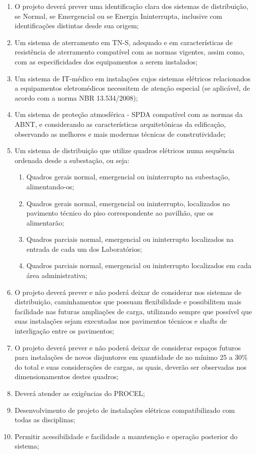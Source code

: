 \begin{enumerate}
	\item O projeto deverá prever uma identificação clara dos sistemas de distribuição, se Normal, se Emergencial ou se Energia Ininterrupta, inclusive com identificações distintas desde sua origem;
	
	\item Um sistema de aterramento em TN-S, adequado e em características de resistência de aterramento compatível com as normas vigentes, assim como, com as especificidades dos equipamentos a serem instalados;
	
	\item Um sistema de IT-médico em instalações cujos sistemas elétricos relacionados a equipamentos eletromédicos necessitem de atenção especial (se aplicável, de acordo com a norma NBR 13.534/2008); 
	
	\item Um sistema de proteção atmosférica - SPDA compatível com as normas da ABNT, e considerando as características arquitetônicas da edificação, observando as melhores e mais modernas técnicas de construtividade;
	
	\item Um sistema de distribuição que utilize quadros elétricos numa sequência ordenada desde a subestação, ou seja:
		\begin{enumerate}
			\item Quadros gerais normal, emergencial ou ininterrupto na subestação, alimentando-os;
			\item Quadros gerais normal, emergencial ou ininterrupto, localizados no pavimento técnico do piso correspondente ao pavilhão, que os alimentarão;
			\item Quadros parciais normal, emergencial ou ininterrupto localizados na entrada de cada um dos Laboratórios;
			\item Quadros parciais normal, emergencial ou ininterrupto localizados em cada área administrativa;
		\end{enumerate}
	
	\item O projeto deverá prever e não poderá deixar de considerar nos sistemas de distribuição, caminhamentos que possuam flexibilidade e possibilitem mais facilidade nas futuras ampliações de carga, utilizando sempre que possível que suas instalações sejam executadas nos pavimentos técnicos e shafts de interligação entre os pavimentos;
	
	\item O projeto deverá prever e não poderá deixar de considerar espaços futuros para instalações de novos disjuntores em quantidade de no mínimo 25 a 30\% do total e suas considerações de cargas, as quais, deverão ser observadas nos dimensionamentos destes quadros; 
	
	\item Deverá atender as exigências do PROCEL;
	
	\item Desenvolvimento de projeto de instalações elétricas compatibilizado com todas as disciplinas;
	
	\item Permitir acessibilidade e facilidade a manutenção e operação posterior do sistema;
\end{enumerate}